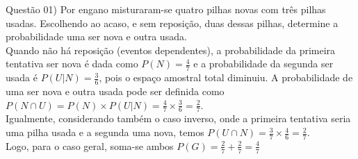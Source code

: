 
\noindent \textcolor{COLOR1}{Questão 01)} Por engano misturaram-se quatro pilhas novas com três pilhas usadas. Escolhendo ao acaso, e sem  reposição, duas dessas pilhas, determine a probabilidade uma ser nova e outra usada.
\\

Quando não há reposição (eventos dependentes), a probabilidade da primeira tentativa ser nova é dada como $P(N) = \frac{4}{7}$ e a probabilidade da segunda ser usada é $P(U|N) = \frac{3}{6}$, pois o espaço amostral total diminuiu. A probabilidade de uma ser nova e outra usada pode ser definida como $P(N\cap U)=P(N)\times P(U|N) = \frac{4}{7}\times \frac{3}{6} = \frac{2}{7}$.\\

Igualmente, considerando também o caso inverso, onde a primeira tentativa seria uma pilha usada e a segunda uma nova, temos  $P(U\cap N)=\frac{3}{7}\times \frac{4}{6} = \frac{2}{7}$.
\\

Logo, para o caso geral, soma-se ambos \textcolor{COLOR2}{$P(G) = \frac{2}{7} + \frac{2}{7} = \frac{4}{7}$}
\\
